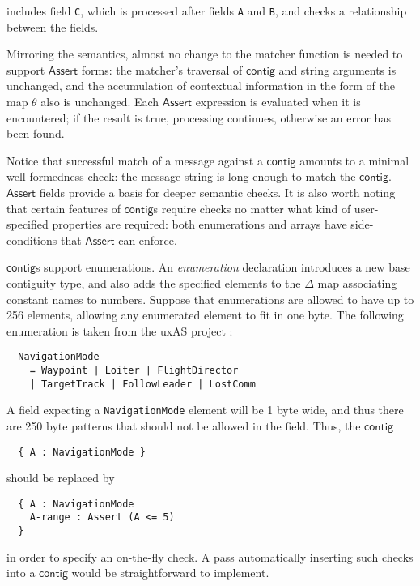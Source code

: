\documentclass[svgnames]{llncs}
\newcommand{\konst}[1]{\ensuremath{\mathsf{#1}}}
\begin{document}
\noindent includes field \verb+C+, which is processed after fields
\verb+A+ and \verb+B+, and checks a relationship between the fields.

Mirroring the semantics, almost no change to the matcher function is
needed to support \konst{Assert} forms: the matcher's traversal of
\konst{contig} and string arguments is unchanged, and the accumulation of
contextual information in the form of the map $\theta$ also is
unchanged. Each \konst{Assert} expression is evaluated when it is
encountered; if the result is true, processing continues, otherwise
an error has been found.

Notice that successful match of a message against a \konst{contig} amounts to
a minimal well-formedness check: the message string is long enough to
match the \konst{contig}. \konst{Assert} fields provide a basis for deeper
semantic checks. It is also worth noting that certain features of
\konst{contig}s require checks no matter what kind of user-specified
properties are required: both enumerations and arrays have
side-conditions that \konst{Assert} can enforce.

\begin{example}
\konst{contig}s support enumerations. An \emph{enumeration} declaration
introduces a new base contiguity type, and also adds the specified
elements to the $\Delta$ map associating constant names to numbers.
Suppose that enumerations are allowed to have up to 256 elements,
allowing any enumerated element to fit in one byte. The following
enumeration is taken from the uxAS project \cite{}:
\begin{verbatim}
  NavigationMode
    = Waypoint | Loiter | FlightDirector
    | TargetTrack | FollowLeader | LostComm
\end{verbatim}

A field expecting a \verb+NavigationMode+ element will be 1 byte wide,
and thus there are 250 byte patterns that should not be allowed in the
field. Thus, the \konst{contig}

\begin{verbatim}
  { A : NavigationMode }
\end{verbatim}

should be replaced by

\begin{verbatim}
  { A : NavigationMode
    A-range : Assert (A <= 5)
  }
\end{verbatim}

\noindent in order to specify an on-the-fly check. A pass automatically
inserting such checks into a \konst{contig} would be straightforward to
implement.

\end{example}
\end{document}
